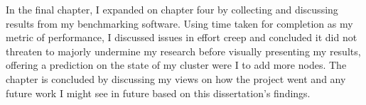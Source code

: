 In the final chapter, I expanded on chapter four by collecting and discussing results from my benchmarking software. Using time taken for completion as my metric of performance, I discussed issues in effort creep and concluded it did not threaten to majorly undermine my research before visually presenting my results, offering a prediction on the state of my cluster were I to add more nodes. The chapter is concluded by discussing my views on how the project went and any future work I might see in future based on this dissertation's findings.
